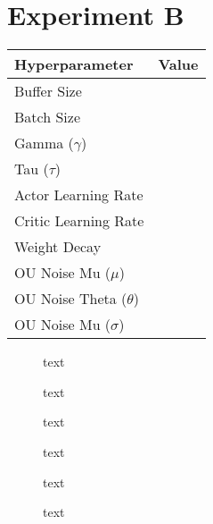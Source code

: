 \section{Experiment B}

\begin{minipage}{0.45\textwidth}
	\centering
	\begin{tabular}{lr}
	\toprule
	\textbf{Hyperparameter} & \textbf{Value} \\
	\midrule
	Buffer Size & \\
	Batch Size & \\
	Gamma ($\gamma$) & \\
	Tau ($\tau$) & \\
	Actor Learning Rate & \\
	Critic Learning Rate & \\
	Weight Decay & \\
	OU Noise Mu ($\mu$) & \\
	OU Noise Theta ($\theta$) & \\
	OU Noise Mu ($\sigma$) & \\
	\bottomrule
	\end{tabular}
\end{minipage}
\hspace{1cm}
\begin{minipage}{0.45\textwidth}
	\centering
\end{minipage}

\begin{figure}[h]
	\begin{minipage}{0.45\textwidth}
		\centering
		
		\caption{text}
		\label{fig:5201_raw_reward_plot}
	\end{minipage}
	\hspace{0.75cm}
	\begin{minipage}{0.45\textwidth}
		\centering
		
		\caption{text}
		\label{fig:5202_average_reward_plot}
	\end{minipage}
\end{figure}

\begin{figure}[h]
	\begin{minipage}{0.45\textwidth}
		\centering
		\caption{text}
		\label{key}
	\end{minipage}
	\hspace{1cm}
	\begin{minipage}{0.45\textwidth}
		\centering
		\caption{text}
		\label{key}
	\end{minipage}
\end{figure}

\begin{figure}[h]
	\begin{minipage}{0.45\textwidth}
		\centering
		\caption{text}
		\label{key}
	\end{minipage}
	\hspace{1cm}
	\begin{minipage}{0.45\textwidth}
		\centering
		\caption{text}
		\label{key}
	\end{minipage}
\end{figure}